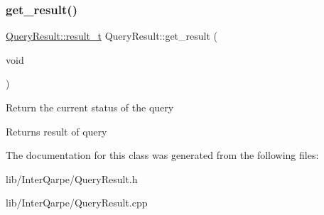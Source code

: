 \subsubsection{\texorpdfstring{get\+\_\+result()}{get\_result()}}
{\footnotesize\ttfamily \hyperlink{classInterQarpe_1_1QueryResult_ad265093e5dea69f229df989d4e18cbb4}{Query\+Result\+::result\+\_\+t} Query\+Result\+::get\+\_\+result (\begin{DoxyParamCaption}\item[{void}]{ }\end{DoxyParamCaption})}

Return the current status of the query

\begin{DoxyReturn}{Returns}
result of query 
\end{DoxyReturn}


The documentation for this class was generated from the following files\+:\begin{DoxyCompactItemize}
\item 
lib/\+Inter\+Qarpe/Query\+Result.\+h\item 
lib/\+Inter\+Qarpe/Query\+Result.\+cpp\end{DoxyCompactItemize}
